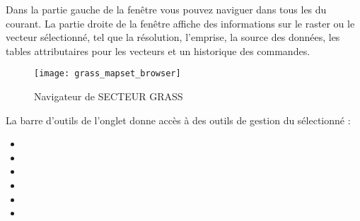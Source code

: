 Dans la partie gauche de la fenêtre vous pouvez naviguer dans tous les  du  courant. La partie droite de la fenêtre affiche des informations sur le raster ou le vecteur sélectionné, tel que la résolution, l'emprise, la source des données, les tables attributaires pour les vecteurs et un historique des commandes.


\begin{figure}[h]
 \begin{center}
 \caption{Navigateur de SECTEUR GRASS \nixcaption}\label{fig:grass_mapset_browser}
 \texttt{[image: grass\_mapset\_browser]}
 \end{center}
\end{figure}

La barre d'outils de l'onglet  donne accès à des outils de gestion du  sélectionné :

\begin{itemize}
\item {}
\item {}
\item {}
\item {}
\item {}
\item {}

\end{itemize}

